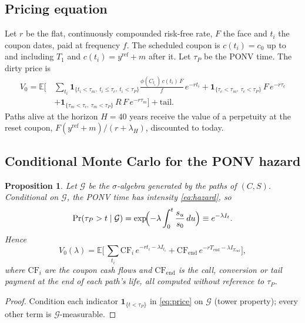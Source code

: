 \documentclass[11pt]{article}
\newtheorem{proposition}{Proposition}
\newcommand{\E}{\mathbb{E}}
\newcommand{\1}{\mathbf{1}}
\begin{document}
\subsection{Pricing equation}
Let $r$ be the flat, continuously compounded risk-free rate, $F$ the face and
$t_i$ the coupon dates, paid at frequency $f$. The scheduled coupon is
$c(t_i)=c_0$ up to and including $T_1$ and $c(t_i)=y^{\mathrm{ref}}+m$ after it.
Let $\tau_P$ be the PONV time. The dirty price is
\begin{equation}\label{eq:price}
\begin{split}
  V_0=\E\Biggl[\,&\sum_{t_i}\1_{\{t_i<\tau_m,\ t_i\le\tau_c,\ t_i<\tau_P\}}
  \frac{\phi(C_{t_i})\,c(t_i)\,F}{f}\,e^{-rt_i}
  + \1_{\{\tau_c<\tau_m,\ \tau_c<\tau_P\}}\,F\,e^{-r\tau_c}\\
  &+ \1_{\{\tau_m<\tau_c,\ \tau_m<\tau_P\}}\,R\,F\,e^{-r\tau_m}\Biggr]
  + \text{tail}.
\end{split}
\end{equation}
Paths alive at the horizon $H=40$ years receive the value of a perpetuity at
the reset coupon, $F(y^{\mathrm{ref}}+m)/(r+\lambda_H)$, discounted to today.

\subsection{Conditional Monte Carlo for the PONV hazard}
\begin{proposition}
Let $\mathcal{G}$ be the $\sigma$-algebra generated by the paths of $(C,S)$.
Conditional on $\mathcal G$, the PONV time has intensity \eqref{eq:hazard}, so
\[
  \Pr(\tau_P>t\mid\mathcal G)=\exp\!\Bigl(-\lambda\int_0^t \frac{s_u}{s_0}\,du\Bigr)
  \equiv e^{-\lambda I_t}.
\]
Hence
\begin{equation}\label{eq:cmc}
  V_0(\lambda)=\E\Biggl[\,\sum_{t_i}\mathrm{CF}_i\,e^{-rt_i-\lambda I_{t_i}}
  + \mathrm{CF}_{\mathrm{end}}\,e^{-rT_{\mathrm{end}}-\lambda I_{T_{\mathrm{end}}}}\Biggr],
\end{equation}
where $\mathrm{CF}_i$ are the coupon cash flows and $\mathrm{CF}_{\mathrm{end}}$
is the call, conversion or tail payment at the end of each path's life, all
computed without reference to $\tau_P$.
\end{proposition}
\begin{proof}
Condition each indicator $\1_{\{t<\tau_P\}}$ in \eqref{eq:price} on
$\mathcal G$ (tower property); every other term is $\mathcal G$-measurable.
\end{proof}
\end{document}
